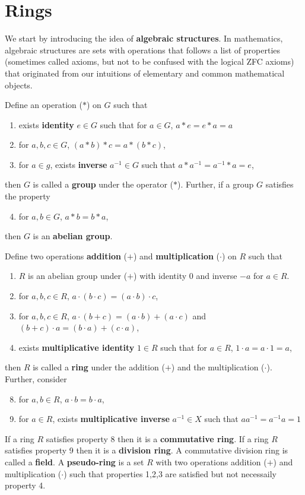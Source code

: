 \documentclass[11pt]{book}
\newcommand{\env}[2]{\begin{#1}#2\end{#1}}
\begin{document}
\section{Rings}
We start by introducing the idea of \textbf{algebraic structures}. In mathematics, algebraic structures are sets with operations that follows a list of properties (sometimes called axioms, but not to be confused with the logical ZFC axioms) that originated from our intuitions of elementary and common mathematical objects. 
\env{definition}{
	Define an operation ($*$) on $G$ such that
	\env{enumerate}{
		\item exists \textbf{identity} $e\in G$ such that for $a\in G$, $a*e=e*a=a$
		\item for $a,b,c\in G$, $(a*b)*c=a*(b*c)$, 
		\item for $a\in g$, exists \textbf{inverse} $a^{-1}\in G$ such that $a*a^{-1}=a^{-1}*a=e$,
	}
	then $G$ is called a \textbf{group} under the operator ($*$). Further, if a group $G$ satisfies the property
	\env{enumerate}{
		\setcounter{enumi}{3}
		\item for $a,b\in G$, $a*b=b*a$,
	}
	then $G$ is an \textbf{abelian group}. 
}
\env{definition}{
	Define two operations \textbf{addition} ($+$) and \textbf{multiplication} ($\cdot$) on $R$ such that
	\env{enumerate}{
		\item $R$ is an abelian group under ($+$) with identity $0$ and inverse $-a$ for $a\in R$.
		\item for $a,b,c\in R$, $a\cdot (b\cdot c)=(a\cdot b)\cdot c$,
		\item for $a,b,c\in R$, $a\cdot (b+c)=(a\cdot b)+(a\cdot c)$ and $(b+c)\cdot a=(b\cdot a)+(c\cdot a)$,
		\item exists \textbf{multiplicative identity} $1\in R$ such that for $a\in R$, $1\cdot a=a\cdot 1=a$,
	}
	then $R$ is called a \textbf{ring} under the addition ($+$) and the multiplication ($\cdot$). Further, consider 
	\env{enumerate}{
		\setcounter{enumi}{7}
		\item for $a,b\in R$, $a\cdot b=b\cdot a$,
		\item for $a\in R$, exists \textbf{multiplicative inverse} $a^{-1}\in X$ such that $aa^{-1}=a^{-1}a=1$
	}
	If a ring $R$ satisfies property 8 then it is a \textbf{commutative ring}. If a ring $R$ satisfies property 9 then it is a \textbf{division ring}. A commutative division ring is called a \textbf{field}. A \textbf{pseudo-ring} is a set $R$ with two operations addition ($+$) and multiplication ($\cdot$) such that properties 1,2,3 are satisfied but not necessaily property 4. 
}
\end{document}
